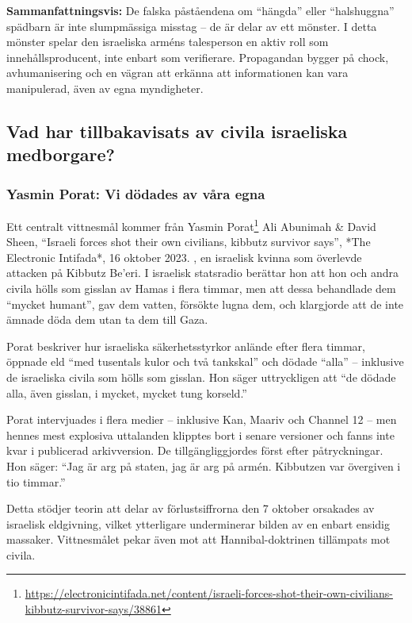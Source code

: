 \textbf{Sammanfattningsvis:} De falska påståendena om “hängda” eller “halshuggna” spädbarn är inte slumpmässiga misstag – de är delar av ett mönster. I detta mönster spelar den israeliska arméns talesperson en aktiv roll som innehållsproducent, inte enbart som verifierare. Propagandan bygger på chock, avhumanisering och en vägran att erkänna att informationen kan vara manipulerad, även av egna myndigheter.


\subsection*{Vad har tillbakavisats av civila israeliska medborgare?}


\subsubsection*{Yasmin Porat: Vi dödades av våra egna}

Ett centralt vittnesmål kommer från Yasmin Porat\footnote{\url{https://electronicintifada.net/content/israeli-forces-shot-their-own-civilians-kibbutz-survivor-says/38861}} Ali Abunimah \& David Sheen, “Israeli forces shot their own civilians, kibbutz survivor says”, *The Electronic Intifada*, 16 oktober 2023.
, en israelisk kvinna som överlevde attacken på Kibbutz Be’eri. I israelisk statsradio berättar hon att hon och andra civila hölls som gisslan av Hamas i flera timmar, men att dessa behandlade dem “mycket humant”, gav dem vatten, försökte lugna dem, och klargjorde att de inte ämnade döda dem utan ta dem till Gaza.

Porat beskriver hur israeliska säkerhetsstyrkor anlände efter flera timmar, öppnade eld “med tusentals kulor och två tankskal” och dödade “alla” – inklusive de israeliska civila som hölls som gisslan. Hon säger uttryckligen att “de dödade alla, även gisslan, i mycket, mycket tung korseld.”

Porat intervjuades i flera medier – inklusive Kan, Maariv och Channel 12 – men hennes mest explosiva uttalanden klipptes bort i senare versioner och fanns inte kvar i publicerad arkivversion. De tillgängliggjordes först efter påtryckningar. Hon säger: “Jag är arg på staten, jag är arg på armén. Kibbutzen var övergiven i tio timmar.” 

Detta stödjer teorin att delar av förlustsiffrorna den 7 oktober orsakades av israelisk eldgivning, vilket ytterligare underminerar bilden av en enbart ensidig massaker. Vittnesmålet pekar även mot att Hannibal-doktrinen tillämpats mot civila.

